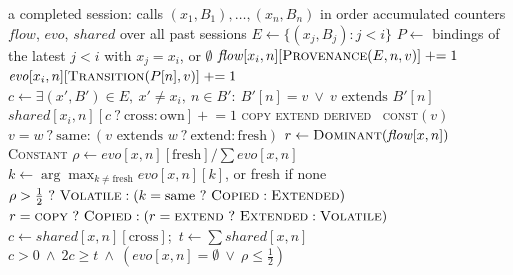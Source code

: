 \begin{algorithm}[t]
\caption{Identifying binding heterogeneity from session traces}
\label{alg:heterogeneity}
\begin{algorithmic}[1]
\Require a completed session: calls $(x_1, B_1), \dots, (x_n, B_n)$ in order
\Require accumulated counters $\mathit{flow}$, $\mathit{evo}$, $\mathit{shared}$ over all past sessions
\Statex
{}
    \State $E \gets \{(x_j, B_j) : j < i\}$ 
    \State $P \gets$ bindings of the latest $j < i$ with $x_j = x_i$, or $\emptyset$
        \State $\mathit{flow}[x_i, n][\textsc{Provenance}(E, n, v)] \mathrel{+}= 1$
            \State $\mathit{evo}[x_i, n][\textsc{Transition}(P[n], v)] \mathrel{+}= 1$
        \EndIf
        \State $c \gets \exists (x', B') \in E,\ x' \neq x_i,\ n \in B' :\ B'[n] = v \ \lor\ v \text{ extends } B'[n]$
        \State $\mathit{shared}[x_i, n][c\ ?\ \mathrm{cross} : \mathrm{own}] \mathrel{+}= 1$
    \EndFor
\EndFor
\EndProcedure
\Statex
{}
     \Return \textsc{copy}
     \Return \textsc{extend}
     \Return \textsc{derived}
    \Else\ \Return \textsc{const}$(v)$ 
    \EndIf
\EndFunction
\Statex
{}
    \State \Return $v = w\ ?\ \mathrm{same} : (v \text{ extends } w\ ?\ \mathrm{extend} : \mathrm{fresh})$
\EndFunction
\Statex
{}
    \State $r \gets \textsc{Dominant}(\mathit{flow}[x, n])$ 
     \Return \textsc{Constant} \EndIf
        \State $\rho \gets \mathit{evo}[x,n][\mathrm{fresh}] / \sum \mathit{evo}[x, n]$
        \State $k \gets \arg\max_{k \neq \mathrm{fresh}} \mathit{evo}[x, n][k]$, or fresh if none
        \State \Return $\rho > \tfrac12\ ?\ \textsc{Volatile} : (k = \mathrm{same}\ ?\ \textsc{Copied} : \textsc{Extended})$
    \EndIf
    \State \Return $r = \textsc{copy}\ ?\ \textsc{Copied} : (r = \textsc{extend}\ ?\ \textsc{Extended} : \textsc{Volatile})$ 
\EndFunction
\Statex
{}
    \State $c \gets \mathit{shared}[x,n][\mathrm{cross}]$;\ $t \gets \sum \mathit{shared}[x,n]$
    \State \Return $c > 0 \ \land\ 2c \ge t \ \land\ (\mathit{evo}[x,n] = \emptyset \ \lor\ \rho \le \tfrac12)$
\EndFunction
\end{algorithmic}
\end{algorithm}

